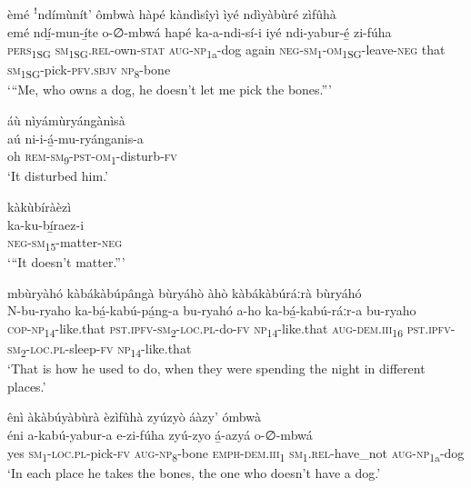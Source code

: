èmé ꜝndímùnít’ ômbwà hàpé kàndìsîyì ìyé ndìyàbùré zìfûhà\\
\gll emé    ndí̲-mun-í̲te      o-∅-mbwá hapé  ka-a-ndi-sí-i      iyé  ndi-yabur-é̲    zi-fúha \\
\textsc{pers}\textsubscript{1SG}  \textsc{sm}\textsubscript{1SG}.\textsc{rel}{}-own-\textsc{stat}  \textsc{aug}{}-\textsc{np}\textsubscript{1a}{}-dog
again  \textsc{neg}{}-\textsc{sm}\textsubscript{1}{}-\textsc{om}\textsubscript{1SG}{}-leave-\textsc{neg}  that  \textsc{sm}\textsubscript{1SG}{}-pick-\textsc{pfv}.\textsc{sbjv}  \textsc{np}\textsubscript{8}{}-bone \\
\glt ‘“Me, who owns a dog, he doesn’t let me pick the bones.”’\bigskip

áù nìyámùryángànìsà\\
\gll aú  ni-i-á̲-mu-ryánganis-a\\
oh  \textsc{rem}{}-\textsc{sm}\textsubscript{9}{}-\textsc{pst}{}-\textsc{om}\textsubscript{1}{}-disturb-\textsc{fv}\\
\glt ‘It disturbed him.’\bigskip

\newpage
kàkùbíràèzì\\
\gll ka-ku-bí̲raez-i\\
\textsc{neg}{}-\textsc{sm}\textsubscript{15}{}-matter-\textsc{neg}\\
\glt ‘“It doesn’t matter.”’\bigskip

mbùryàhó kàbákàbúpângà bùryáhò àhò kàbákàbúráːrà bùryáhó\\
\gll N-bu-ryaho    ka-bá̲-kabú-pá̲ng-a      bu-ryahó a-ho      ka-bá̲-kabú-ráːr-a      bu-ryaho\\
\textsc{cop}{}-\textsc{np}\textsubscript{14}{}-like.that  \textsc{pst}.\textsc{ipfv}{}-\textsc{sm}\textsubscript{2}{}-\textsc{loc}.\textsc{pl}{}-do-\textsc{fv}  \textsc{np}\textsubscript{14}{}-like.that
\textsc{aug}{}-\textsc{dem}.\textsc{iii}\textsubscript{16}  \textsc{pst}.\textsc{ipfv}{}-\textsc{sm}\textsubscript{2}{}-\textsc{loc}.\textsc{pl}{}-sleep-\textsc{fv}  \textsc{np}\textsubscript{14}{}-like.that\\
\glt ‘That is how he used to do, when they were spending the night in different places.’\bigskip

ênì àkàbúyàbùrà èzìfûhà zyúzyò áàzy’ ómbwà\\
\gll éni  a-kabú-yabur-a    e-zi-fúha zyú-zyo    á̲-azyá      o-∅-mbwá \\
yes  \textsc{sm}\textsubscript{1}{}-\textsc{loc}.\textsc{pl}{}-pick-\textsc{fv}  \textsc{aug}{}-\textsc{np}\textsubscript{8}{}-bone
\textsc{emph}{}-\textsc{dem}.\textsc{iii}\textsubscript{1}  \textsc{sm}\textsubscript{1}.\textsc{rel}{}-have\_not  \textsc{aug}{}-\textsc{np}\textsubscript{1a}{}-dog\\
\glt ‘In each place he takes the bones, the one who doesn’t have a dog.’\bigskip

